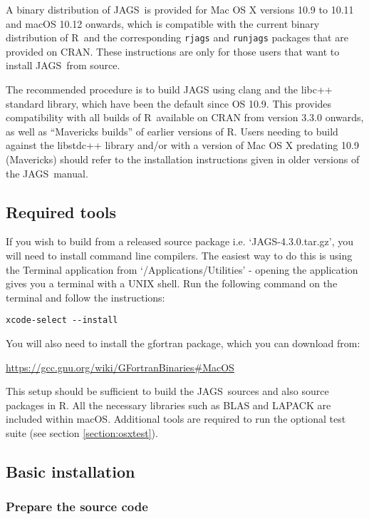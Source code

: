 \documentclass[11pt, a4paper, titlepage]{article}
\newcommand{\release}{4.3.0}
\newcommand{\JAGS}{\textsf{JAGS}}
\newcommand{\R}{\textsf{R}}
\newcommand{\file}[1]{{`\normalfont\textsf{#1}'}}
\begin{document}
A binary distribution of \JAGS\ is provided for Mac OS X versions 
10.9 to 10.11 and macOS 10.12 onwards, which is compatible with the
current binary distribution of \R\ and the corresponding \texttt{rjags} 
and \texttt{runjags} packages that are provided on CRAN. These instructions 
are only for those users that want to install \JAGS\ from source.

The recommended procedure is to build JAGS using clang and the libc++ 
standard library, which have been the default since OS 10.9.  This provides 
compatibility with all builds of \R\ available on CRAN from version 3.3.0 
onwards, as well as ``Mavericks builds'' of earlier versions of \R.  Users 
needing to build against the libstdc++ library and/or with a version of 
Mac OS X predating 10.9 (Mavericks) should refer to the installation 
instructions given in older versions of the \JAGS~manual.

\subsection{Required tools}

If you wish to build from a released source package i.e.
\file{JAGS-\release.tar.gz}, you will need to install command line compilers. 
The easiest way to do this is using the Terminal application from 
\file{/Applications/Utilities} - opening the application gives you a terminal 
with a UNIX shell.  Run the following command on the terminal and follow the
instructions:

\begin{verbatim}
xcode-select --install
\end{verbatim}


You will also need to install the gfortran package, which you 
can download from:

\url{https://gcc.gnu.org/wiki/GFortranBinaries#MacOS}

This setup should be sufficient to build the \JAGS\ sources and also source
packages in R.  All the necessary libraries such as BLAS and LAPACK are
included within macOS.  Additional tools are required to run the optional 
test suite (see section \ref{section:osxtest}).


\subsection{Basic installation}


\subsubsection{Prepare the source code}
\end{document}
